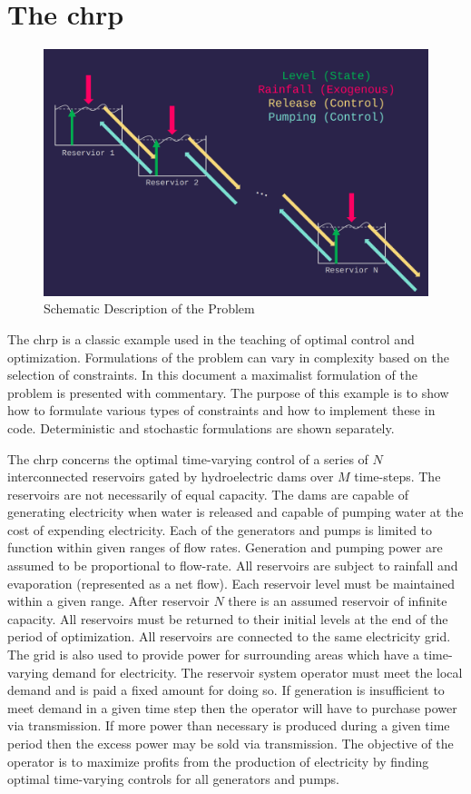 \documentclass[12pt]{article}
\begin{document}
\section*{The \gls{chrp}}

\begin{figure}[H]
	\centering
	\includegraphics[width=\linewidth]{figs/Schematic.png}
	\caption{Schematic Description of the Problem}
	\label{fig:schematic}
\end{figure}

The \gls{chrp} is a classic example used in the teaching of optimal control and optimization. Formulations of the problem can vary in complexity based on the selection of constraints. In this document a maximalist formulation of the problem is presented with commentary. The purpose of this example is to show how to formulate various types of constraints and how to implement these in code. Deterministic and stochastic formulations are shown separately.

The \gls{chrp} concerns the optimal time-varying control of a series of $N$ interconnected reservoirs gated by hydroelectric dams over $M$ time-steps. The reservoirs are not necessarily of equal capacity. The dams are capable of generating electricity when water is released and capable of pumping water at the cost of expending electricity. Each of the generators and pumps is limited to function within given ranges of flow rates. Generation and pumping power are assumed to be proportional to flow-rate. All reservoirs are subject to rainfall and evaporation (represented as a net flow). Each reservoir level must be maintained within a given range. After reservoir $N$ there is an assumed reservoir of infinite capacity. All reservoirs must be returned to their initial levels at the end of the period of optimization. All reservoirs are connected to the same electricity grid. The grid is also used to provide power for surrounding areas which have a time-varying demand for electricity. The reservoir system operator must meet the local demand and is paid a fixed amount for doing so. If generation is insufficient to meet demand in a given time step then the operator will have to purchase power via transmission. If more power than necessary is produced during a given time period then the excess power may be sold via transmission. The objective of the operator is to maximize profits from the production of electricity by finding optimal time-varying controls for all generators and pumps.
\end{document}
